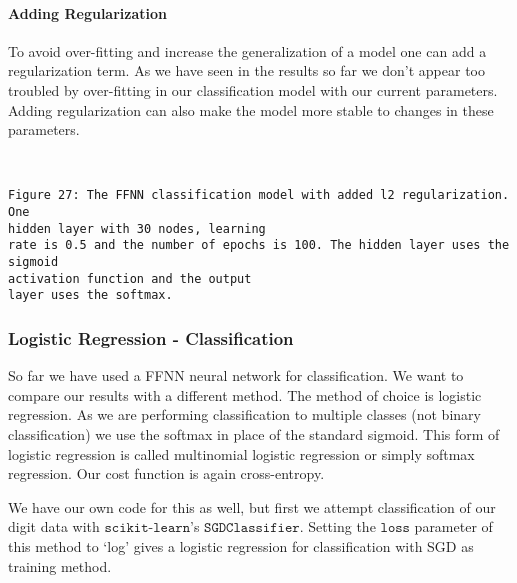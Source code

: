 \documentclass[11pt]{article}
\begin{document}
    \hypertarget{adding-regularization}{%
\paragraph{Adding Regularization}\label{adding-regularization}}

To avoid over-fitting and increase the generalization of a model one can
add a regularization term. As we have seen in the results so far we
don't appear too troubled by over-fitting in our classification model
with our current parameters. Adding regularization can also make the
model more stable to changes in these parameters.

    \begin{center}
    \end{center}
    { \hspace*{\fill} \\}
    
    \begin{Verbatim}[commandchars=\\\{\}]
Figure 27: The FFNN classification model with added l2 regularization. One
hidden layer with 30 nodes, learning
rate is 0.5 and the number of epochs is 100. The hidden layer uses the sigmoid
activation function and the output
layer uses the softmax.
    \end{Verbatim}

    \hypertarget{logistic-regression---classification}{%
\subsubsection{Logistic Regression -
Classification}\label{logistic-regression---classification}}

So far we have used a FFNN neural network for classification. We want to
compare our results with a different method. The method of choice is
logistic regression. As we are performing classification to multiple
classes (not binary classification) we use the softmax in place of the
standard sigmoid. This form of logistic regression is called multinomial
logistic regression or simply softmax regression. Our cost function is
again cross-entropy.

We have our own code for this as well, but first we attempt
classification of our digit data with \(\texttt{scikit-learn}\)'s
\(\texttt{SGDClassifier}\). Setting the \(\texttt{loss}\) parameter of
this method to `log' gives a logistic regression for classification with
SGD as training method.
\end{document}

